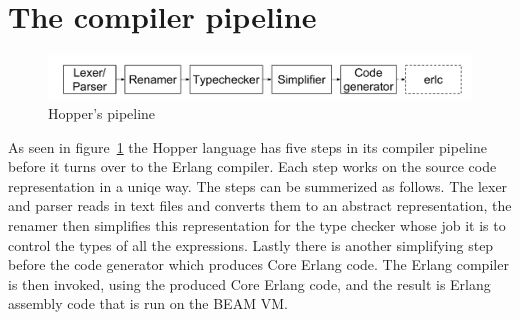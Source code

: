 \section{The compiler pipeline}


\begin{figure}[h!]
\centering
  \includegraphics[width=0.6\pdfpagewidth]{figure/pipeline}
  \caption{Hopper's pipeline}
  \label{fig:pipeline}
\end{figure}


As seen in figure~\ref{fig:pipeline} the Hopper language has five steps in its compiler
pipeline before it turns over to the Erlang compiler. Each step works on the 
source code representation in a uniqe way. The steps can be summerized as
follows. The lexer and parser reads in text files and converts them to an 
abstract representation, the renamer then simplifies this representation for the 
type checker whose job it is to control the types of all the expressions. Lastly 
there is another simplifying step before the code generator which produces Core
Erlang code. The Erlang compiler is then invoked, using the produced Core Erlang
code, and the result is Erlang assembly code that is run on the BEAM VM.
